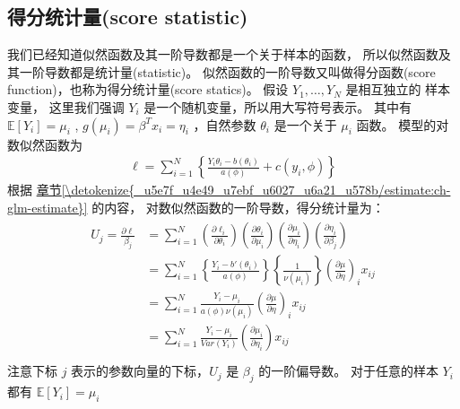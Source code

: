 \documentclass[letterpaper,10pt,english]{sphinxmanual}
\begin{document}
\subsection{得分统计量(score statistic)}
\label{\detokenize{_u6a21_u578b_u8bc4_u4f30/influence:score-statistic}}
我们已经知道似然函数及其一阶导数都是一个关于样本的函数，
所以似然函数及其一阶导数都是统计量(statistic)。
似然函数的一阶导数又叫做得分函数(score function)，也称为得分统计量(score statics)。
假设 \(Y_1,\dots,Y_N\) 是相互独立的  样本变量，
这里我们强调 \(Y_i\) 是一个随机变量，所以用大写符号表示。
其中有 \(\mathbb{E}[Y_i]=\mu_i\) , \(g(\mu_i)=\beta^T x_i=\eta_i\)
，自然参数 \(\theta_i\) 是一个关于 \(\mu_i\) 函数。
 模型的对数似然函数为
\begin{equation}\label{equation:模型评估/influence:模型评估/influence:2}
\begin{split}\ell= \sum_{i=1}^N \left \{   \frac{Y_i \theta_i - b(\theta_i)}{a(\phi)}   + c(y_i,\phi)   \right \}\end{split}
\end{equation}
根据 \hyperref[\detokenize{_u5e7f_u4e49_u7ebf_u6027_u6a21_u578b/estimate:ch-glm-estimate}]{章节\ref{\detokenize{_u5e7f_u4e49_u7ebf_u6027_u6a21_u578b/estimate:ch-glm-estimate}}} 的内容，  对数似然函数的一阶导数，得分统计量为：
\begin{align}\label{equation:模型评估/influence:模型评估/influence:3}\!\begin{aligned}
U_j = \frac{ \partial \ell}{\beta_j}
&= \sum_{i=1}^N \left ( \frac{\partial \ell_i}{\partial \theta_i} \right )
\left ( \frac{\partial \theta_i}{\partial \mu_i} \right )
\left ( \frac{\partial \mu_i}{\partial \eta_i} \right )
\left ( \frac{\partial \eta_i}{\partial \beta_j} \right )\\
&= \sum_{i=1}^N \left \{ \frac{Y_i-b'(\theta_i)}{a(\phi)}   \right \}
\left \{ \frac{1}{\nu(\mu_i)} \right \} \left ( \frac{\partial \mu}{\partial \eta} \right )_i x_{ij}\\
&= \sum_{i=1}^N \frac{Y_i-\mu_i}{a(\phi) \nu(\mu_i) } \left ( \frac{\partial \mu}{\partial \eta} \right )_i x_{ij}\\
&= \sum_{i=1}^N \frac{Y_i-\mu_i}{Var(Y_i) } \left ( \frac{\partial \mu_i}{\partial \eta_i} \right ) x_{ij}\\
\end{aligned}\end{align}
注意下标 \(j\) 表示的参数向量的下标，\(U_j\) 是 \(\beta_j\) 的一阶偏导数。
对于任意的样本 \(Y_i\) 都有 \(\mathbb{E}[Y_i]=\mu_i\)
\end{document}

